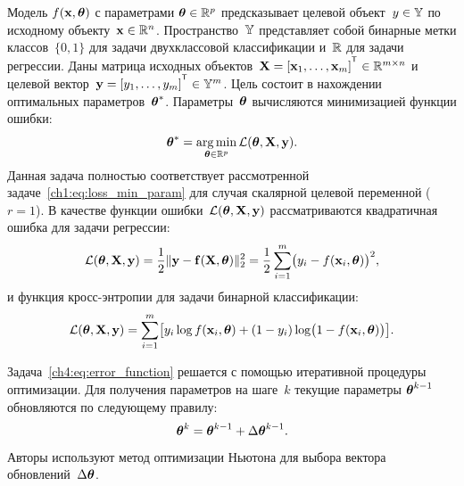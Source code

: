 Модель $f( \mathbf{x}, \boldsymbol{\theta})$ с параметрами $\boldsymbol{\theta} \in \mathbb{R}^p$ предсказывает целевой объект~$y \in \mathbb{Y}$ по исходному объекту~$\mathbf{x} \in \mathbb{R}^{n}$. Пространство~$\mathbb{Y}$ представляет собой бинарные метки классов~$\{0, 1\}$ для задачи двухклассовой классификации и~$\mathbb{R}$ для задачи регрессии.
Даны матрица исходных объектов~$\bX = [\bx_1, \dots, \bx_m]^{\T} \in \bbR^{m \times n}$ и целевой вектор~$\by = [y_1, \dots, y_m]^{\T} \in \bbY^{m}$. 
Цель состоит в нахождении оптимальных параметров~$\boldsymbol{\theta}^*$.
Параметры~$\boldsymbol{\theta}$ вычисляются минимизацией функции ошибки:
\begin{equation}
	\boldsymbol{\theta}^* = \mathop{\arg \min}\limits_{\boldsymbol{\theta} \in \mathbb{R}^p} \mathcal{L}(\boldsymbol{\theta}, \mathbf{X}, \mathbf{y}).
	\label{ch4:eq:error_function}
\end{equation}
Данная задача полностью соответствует рассмотренной задаче~\eqref{ch1:eq:loss_min_param} для случая скалярной целевой переменной ($r=1$).
В качестве функции ошибки~$\mathcal{L} (\boldsymbol{\theta}, \mathbf{X}, \mathbf{y})$ рассматриваются квадратичная ошибка для задачи регрессии:
\begin{equation}
	\mathcal{L}(\boldsymbol{\theta}, \mathbf{X}, \mathbf{y}) = \frac 12 \| \mathbf{y} - \mathbf{f}(\mathbf{X}, \boldsymbol{\theta}) \|_2^2 = \frac 12 \sum_{i=1}^m \bigl( y_i - f(\mathbf{x}_i,  \boldsymbol{\theta})\bigr)^2,
	\label{ch4:eq:squared_error}
\end{equation}
и функция кросс-энтропии для задачи бинарной классификации: 
\begin{equation}
	\mathcal{L}(\boldsymbol{\theta}, \mathbf{X}, \mathbf{y}) = \sum_{i=1}^m \bigl[y_i \log f (\mathbf{x}_i , \boldsymbol{\theta}) + (1-y_i) \log \bigl(1 - f (\mathbf{x}_i , \boldsymbol{\theta})\bigr)\bigr].
	\label{ch4:eq:log_loss}
\end{equation}

Задача~\eqref{ch4:eq:error_function} решается с помощью итеративной процедуры оптимизации. 
Для получения параметров на шаге~$k$ текущие параметры $\boldsymbol{\theta}^{k-1}$ обновляются по следующему правилу:
\begin{equation}
	\boldsymbol{\theta}^k = \boldsymbol{\theta}^{k - 1} + \Delta \boldsymbol{\theta}^{k - 1}.
	\label{ch4:eq:update_rule}
\end{equation}
Авторы используют метод оптимизации Ньютона для выбора вектора обновлений~$\Delta \boldsymbol{\theta}$.

